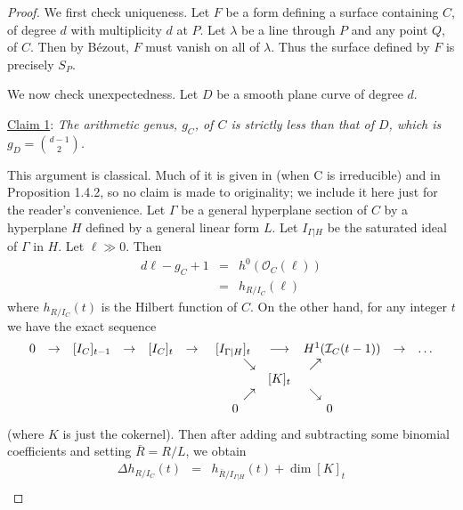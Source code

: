 \documentclass[12pt]{amsart}
\numberwithin{equation}{section}
\theoremstyle{definition}
\begin{document}
\begin{proof}

We first check uniqueness.  Let $F$ be a form defining a surface containing $C$, of degree $d$ with 
multiplicity $d$ at $P$. Let $\lambda$ be a line through $P$ and any point $Q$, of $C$. Then  by 
B\'ezout, $F$ must vanish on all of $\lambda$. Thus the surface defined by $F$ is precisely $S_P$.

We now check unexpectedness. Let $D$ be a smooth plane curve of degree $d$. 

\medskip

\noindent \underline{Claim 1}: {\em The arithmetic genus, $g_C$, of $C$ is strictly less than that of $D$, which is $g_D = \binom{d-1}{2}$. }

\medskip

This argument is classical. Much of it is given in \cite{harris} (when C is irreducible) and in \cite{migbook} Proposition 1.4.2, so no claim is made to originality; we include it here just for the reader's convenience.
Let $\Gamma$ be a general hyperplane section of $C$ by a hyperplane $H$ defined by a general linear form $L$. Let $I_{\Gamma | H}$ be the saturated ideal of $\Gamma$ in $H$. Let $\ell \gg 0$. Then
\[
\begin{array}{rcl}
d\ell - g_C + 1 & = & h^0(\mathcal O_C(\ell)) \\
& = & h_{R/I_C}(\ell)
\end{array}
\]
where $h_{R/I_C}(t)$ is the Hilbert function of $C$. On the other hand, for any integer $t$ we have the exact sequence
\[
\begin{array}{ccccccccccccccccccc}
0 & \rightarrow & [I_C]_{t-1} & \rightarrow & [I_C]_t & \rightarrow & [I_{\Gamma|H} ]_t & \longrightarrow & H^1(\mathcal I_C(t-1)) & \rightarrow & \dots \\
&&&&&&\hbox{\ \ \ \ \ \ \ } \searrow & & \nearrow \hbox{\ \ \ \ \ \ \ \ \ \ \ \ } \\
&&&&&&& [K]_t \\
&&&&&&\hbox{\ \ \ \ \ \ \ } \nearrow & & \searrow \hbox{\ \ \ \ \ \ \ \ \ \ \ \ } \\
&&&&&&\hbox{\  } 0 & & 0 \hbox{\ \ \ \ \ \  } \\
\end{array}
\]
(where $K$ is just the cokernel). Then after adding and subtracting some binomial coefficients and setting $\bar R = R/L$, we obtain
\[
\begin{array}{rcl}
\Delta h_{R/I_C} (t) & = & h_{\bar R/I_{\Gamma|H}}(t) + \dim [K]_t \\ 

\end{array}\]
\end{proof}
\end{document}
